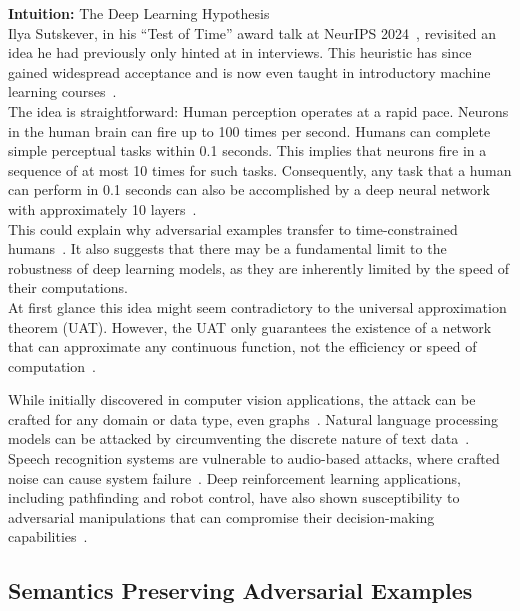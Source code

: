 \documentclass[a4paper, oneside]{discothesis}
\begin{document}
\begin{highlightbox}
	\textbf{Intuition:} The Deep Learning Hypothesis \\

	Ilya Sutskever, in his ``Test of Time'' award talk at NeurIPS 2024~\cite{sutskever2014sequence}, revisited an idea he had previously only hinted at in interviews. This heuristic has since gained widespread acceptance and is now even taught in introductory machine learning courses~\cite{guerzhoy_ann}. \\

	The idea is straightforward: Human perception operates at a rapid pace. Neurons in the human brain can fire up to 100 times per second. Humans can complete simple perceptual tasks within 0.1 seconds. This implies that neurons fire in a sequence of at most 10 times for such tasks. Consequently, any task that a human can perform in 0.1 seconds can also be accomplished by a deep neural network with approximately 10 layers~\cite{sutskever2014sequence}. \\

	This could explain why adversarial examples transfer to time-constrained humans~\cite{elsayed2018adversarial}. It also suggests that there may be a fundamental limit to the robustness of deep learning models, as they are inherently limited by the speed of their computations. \\

	At first glance this idea might seem contradictory to the universal approximation theorem (UAT). However, the UAT only guarantees the existence of a network that can approximate any continuous function, not the efficiency or speed of computation~\cite{hornik1989multilayer}.
\end{highlightbox}

While initially discovered in computer vision applications, the attack can be crafted for any domain or data type, even graphs~\cite{Kashyap2024AdversarialAA}. Natural language processing models can be attacked by circumventing the discrete nature of text data~\cite{Han2022TextAA, meng2020geometry, yang2024assessing}. Speech recognition systems are vulnerable to audio-based attacks, where crafted noise can cause system failure~\cite{rajaratnam2018noise}. Deep reinforcement learning applications, including pathfinding and robot control, have also shown susceptibility to adversarial manipulations that can compromise their decision-making capabilities~\cite{Bai2018AdversarialEC}.

\subsection{Semantics Preserving Adversarial Examples}
\end{document}

